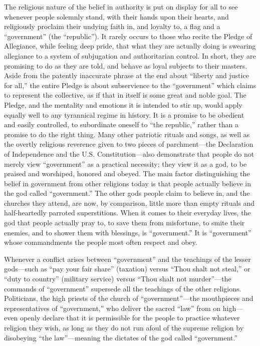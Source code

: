 \documentclass{book}
\begin{document}
The religious nature of the belief in authority is put on display for all to see whenever people solemnly stand, with their hands upon their hearts, and religiously proclaim their undying faith in, and loyalty to, a flag and a \enquote{government} (the \enquote{republic}). It rarely occurs to those who recite the Pledge of Allegiance, while feeling deep pride, that what they are actually doing is swearing allegiance to a system of subjugation and authoritarian control. In short, they are promising to do as they are told, and behave as loyal subjects to their masters. Aside from the patently inaccurate phrase at the end about \enquote{liberty and justice for all,} the entire Pledge is about subservience to the \enquote{government} which claims to represent the collective, as if that in itself is some great and noble goal. The Pledge, and the mentality and emotions it is intended to stir up, would apply equally well to any tyrannical regime in history. It is a promise to be obedient and easily controlled, to subordinate oneself to \enquote{the republic,} rather than a promise to do the right thing. Many other patriotic rituals and songs, as well as the overtly religious reverence given to two pieces of parchment---the Declaration of Independence and the U.S. Constitution---also demonstrate that people do not merely view \enquote{government} as a practical necessity; they view it as a god, to be praised and worshiped, honored and obeyed. The main factor distinguishing the belief in government from other religions today is that people actually believe in the god called \enquote{government.} The other gods people claim to believe in, and the churches they attend, are now, by comparison, little more than empty rituals and half-heartedly parroted superstitions. When it comes to their everyday lives, the god that people actually pray to, to save them from misfortune, to smite their enemies, and to shower them with blessings, is \enquote{government.} It is \enquote{government} whose commandments the people most often respect and obey.

Whenever a conflict arises between \enquote{government} and the teachings of the lesser gods---such as \enquote{pay your fair share} (taxation) versus \enquote{Thou shalt not steal,} or \enquote{duty to country} (military service) versus \enquote{Thou shalt not murder}---the commands of \enquote{government} supersede all the teachings of the other religions. Politicians, the high priests of the church of \enquote{government}---the mouthpieces and representatives of \enquote{government,} who deliver the sacred \enquote{law} from on high---even openly declare that it is permissible for the people to practice whatever religion they wish, as long as they do not run afoul of the supreme religion by disobeying \enquote{the law}---meaning the dictates of the god called \enquote{government.}
\end{document}

